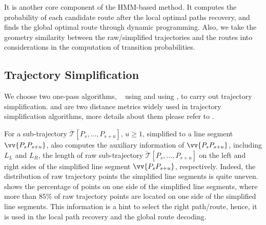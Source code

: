 
It is another core component of the HMM-based method. It computes the probability of each candidate route after the local optimal paths recovery, and finds the global optimal route through dynamic programming.
Also, we take the geometry similarity between the raw/simplified trajectories and the routes into considerations in the computation of transition probabilities.


\subsection{Trajectory Simplification}
\label{sec:simp}



We choose two one-pass algorithms, \ie~\siped \cite{Zhao:Sleeve} using \ped and \cised\cite{Lin:Cised} using \sed, to carry out trajectory
simplification. \ped and \sed are two distance metrics widely used in trajectory simplification algorithms, more details about them please refer to \cite{Lin:Cised, Zhang:Evaluation}.


For a sub-trajectory $\dddot{\mathcal{T}}[P_s, ..., P_{s+u}]$, $u\ge 1$, simplified to a line segment $\vv{P_{s}P_{s+u}}$, \stmm also computes the auxiliary information of $\vv{P_{s}P_{s+u}}$, including $L_L$ and $L_R$, the length of raw sub-trajectory $\dddot{\mathcal{T}}[P_s, ..., P_{s+u}]$ on the left and right sides of the simplified line segment $\vv{P_{s}P_{s+u}}$, respectively. 
%
Indeed, the distribution of raw trajectory points \wrt the simplified line segments is quite uneven.
 shows the percentage of points on one side of the simplified line segments, where more than $85\%$ of raw trajectory points are located on one side of the simplified line segments.
This information is a hint to select the right path/route, hence, it is used in the local path recovery and the global route decoding.

